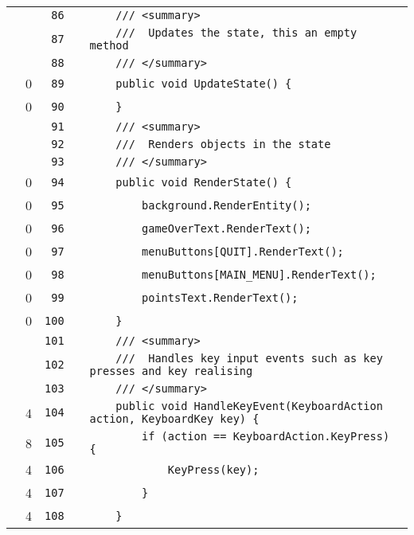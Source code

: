 \documentclass[a4paper,landscape,10pt]{article}
\begin{document}
\begin{longtable}[l]{lrrll}
\cellcolor{gray} &  & \verb~86~ & & \verb~    /// <summary>~\\
\cellcolor{gray} &  & \verb~87~ & & \verb~    ///  Updates the state, this an empty method~\\
\cellcolor{gray} &  & \verb~88~ & & \verb~    /// </summary>~\\
\cellcolor{red} & 0 & \verb~89~ & & \verb~    public void UpdateState() {~\\
\cellcolor{red} & 0 & \verb~90~ & & \verb~    }~\\
\cellcolor{gray} &  & \verb~91~ & & \verb~    /// <summary>~\\
\cellcolor{gray} &  & \verb~92~ & & \verb~    ///  Renders objects in the state~\\
\cellcolor{gray} &  & \verb~93~ & & \verb~    /// </summary>~\\
\cellcolor{red} & 0 & \verb~94~ & & \verb~    public void RenderState() {~\\
\cellcolor{red} & 0 & \verb~95~ & & \verb~        background.RenderEntity();~\\
\cellcolor{red} & 0 & \verb~96~ & & \verb~        gameOverText.RenderText();~\\
\cellcolor{red} & 0 & \verb~97~ & & \verb~        menuButtons[QUIT].RenderText();~\\
\cellcolor{red} & 0 & \verb~98~ & & \verb~        menuButtons[MAIN_MENU].RenderText();~\\
\cellcolor{red} & 0 & \verb~99~ & & \verb~        pointsText.RenderText();~\\
\cellcolor{red} & 0 & \verb~100~ & & \verb~    }~\\
\cellcolor{gray} &  & \verb~101~ & & \verb~    /// <summary>~\\
\cellcolor{gray} &  & \verb~102~ & & \verb~    ///  Handles key input events such as key presses and key realising~\\
\cellcolor{gray} &  & \verb~103~ & & \verb~    /// </summary>~\\
\cellcolor{green} & 4 & \verb~104~ & & \verb~    public void HandleKeyEvent(KeyboardAction action, KeyboardKey key) {~\\
\cellcolor{green} & 8 & \verb~105~ & & \verb~        if (action == KeyboardAction.KeyPress) {~\\
\cellcolor{green} & 4 & \verb~106~ & & \verb~            KeyPress(key);~\\
\cellcolor{green} & 4 & \verb~107~ & & \verb~        }~\\
\cellcolor{green} & 4 & \verb~108~ & & \verb~    }~\\

\end{longtable}
\end{document}
